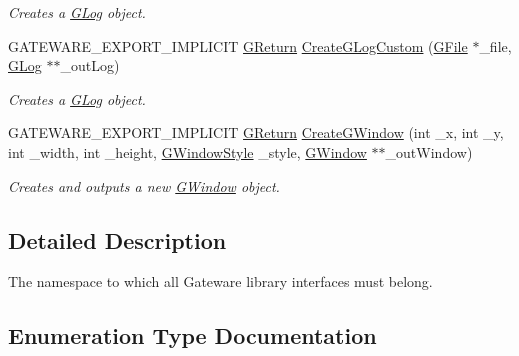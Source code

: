 \begin{DoxyCompactItemize}
\begin{DoxyCompactList}\small\item\em Creates a \hyperlink{classGW_1_1SYSTEM_1_1GLog}{G\+Log} object. \end{DoxyCompactList}\item 
G\+A\+T\+E\+W\+A\+R\+E\+\_\+\+E\+X\+P\+O\+R\+T\+\_\+\+I\+M\+P\+L\+I\+C\+IT \hyperlink{namespaceGW_a67a839e3df7ea8a5c5686613a7a3de21}{G\+Return} \hyperlink{namespaceGW_1_1SYSTEM_adc1b7d81acb493280fb43e36ef5fca56}{Create\+G\+Log\+Custom} (\hyperlink{classGW_1_1SYSTEM_1_1GFile}{G\+File} $\ast$\+\_\+file, \hyperlink{classGW_1_1SYSTEM_1_1GLog}{G\+Log} $\ast$$\ast$\+\_\+out\+Log)
\begin{DoxyCompactList}\small\item\em Creates a \hyperlink{classGW_1_1SYSTEM_1_1GLog}{G\+Log} object. \end{DoxyCompactList}\item 
G\+A\+T\+E\+W\+A\+R\+E\+\_\+\+E\+X\+P\+O\+R\+T\+\_\+\+I\+M\+P\+L\+I\+C\+IT \hyperlink{namespaceGW_a67a839e3df7ea8a5c5686613a7a3de21}{G\+Return} \hyperlink{namespaceGW_1_1SYSTEM_a4e046f8c5f7a2eabd19a903c9a0651f7}{Create\+G\+Window} (int \+\_\+x, int \+\_\+y, int \+\_\+width, int \+\_\+height, \hyperlink{namespaceGW_1_1SYSTEM_ad117891e556631f842625c348d36a071}{G\+Window\+Style} \+\_\+style, \hyperlink{classGW_1_1SYSTEM_1_1GWindow}{G\+Window} $\ast$$\ast$\+\_\+out\+Window)
\begin{DoxyCompactList}\small\item\em Creates and outputs a new \hyperlink{classGW_1_1SYSTEM_1_1GWindow}{G\+Window} object. \end{DoxyCompactList}\end{DoxyCompactItemize}


\subsection{Detailed Description}
The namespace to which all Gateware library interfaces must belong. 

\subsection{Enumeration Type Documentation}
\mbox{\label{namespaceGW_1_1SYSTEM_a309fd3a92512dd2bfa8065d99c0d7fcb}} 
